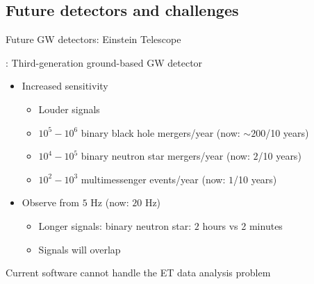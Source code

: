 \documentclass[usenames,dvipsnames,t]{beamer}
\begin{document}
    

\subsection{Future detectors and challenges}

\begin{frame}{Future GW detectors: Einstein Telescope}
  \def\x{3mm}
  \def\y{2mm}
  \def\z{1mm}

  : Third-generation ground-based GW detector~\cite{ET:2019dnz, Abac:2025saz}
  \begin{itemize}
    \item<2-> Increased sensitivity
    
    \begin{itemize}
      \item Louder signals
      
      \vspace{\z}

      \item $10^{5} - 10^{6}$ binary black hole mergers/year (now: $\sim 200$/10 years)
      
      \vspace{\z}
      
      \item $10^{4} - 10^{5}$ binary neutron star mergers/year (now: $2$/10 years)

      \vspace{\z}
      
      \item $10^{2} - 10^{3}$ multimessenger events/year (now: $1$/10 years)
    \end{itemize}

    \vspace{\y}

    \item<3-> Observe from $5$ Hz (now: $20$ Hz)
    \begin{itemize}
      \item Longer signals: binary neutron star: $2$ hours vs 2 minutes 
      \item Signals will overlap
    \end{itemize}
  \end{itemize}

  \vspace{4mm}

  \begin{tcolorbox}[colback=red!10!white, colframe=red!80!black, coltext=black]
  Current software cannot handle the ET data analysis problem~\cite{Hu:2024mvn}
  \end{tcolorbox}
\end{frame}
\end{document}
